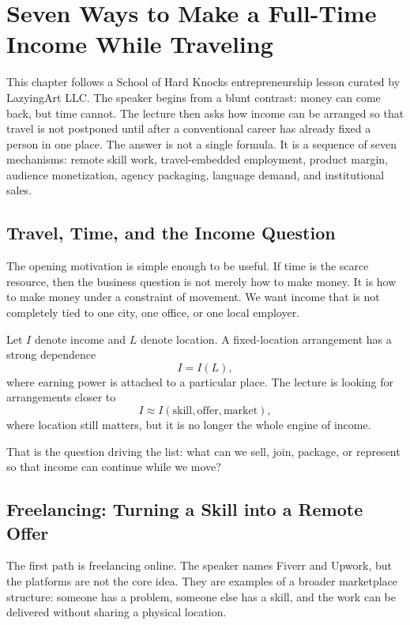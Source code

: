 \chapter{Seven Ways to Make a Full-Time Income While Traveling}

This chapter follows a School of Hard Knocks entrepreneurship lesson curated by LazyingArt LLC. The speaker begins from a blunt contrast: money can come back, but time cannot. The lecture then asks how income can be arranged so that travel is not postponed until after a conventional career has already fixed a person in one place. The answer is not a single formula. It is a sequence of seven mechanisms: remote skill work, travel-embedded employment, product margin, audience monetization, agency packaging, language demand, and institutional sales.

\section{Travel, Time, and the Income Question}

The opening motivation is simple enough to be useful. If time is the scarce resource, then the business question is not merely how to make money. It is how to make money under a constraint of movement. We want income that is not completely tied to one city, one office, or one local employer.

Let \(I\) denote income and \(L\) denote location. A fixed-location arrangement has a strong dependence
\begin{equation}
I = I(L),
\end{equation}
where earning power is attached to a particular place. The lecture is looking for arrangements closer to
\begin{equation}
I \approx I(\text{skill},\text{offer},\text{market}),
\end{equation}
where location still matters, but it is no longer the whole engine of income.

That is the question driving the list: what can we sell, join, package, or represent so that income can continue while we move?

\section{Freelancing: Turning a Skill into a Remote Offer}

The first path is freelancing online. The speaker names Fiverr and Upwork, but the platforms are not the core idea. They are examples of a broader marketplace structure: someone has a problem, someone else has a skill, and the work can be delivered without sharing a physical location.


